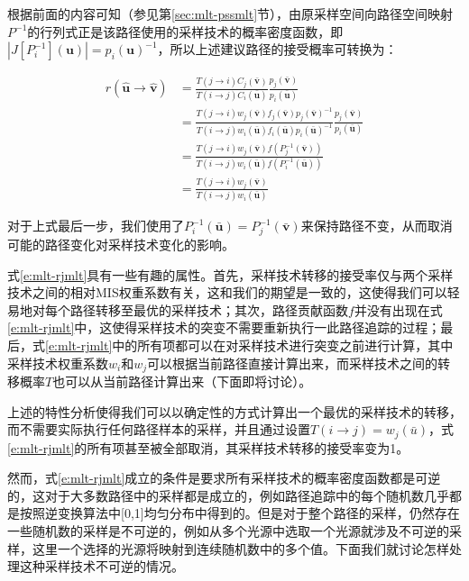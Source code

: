 根据前面的内容可知（参见第\ref{sec:mlt-pssmlt}节），由原采样空间向路径空间映射$P^{-1}$的行列式正是该路径使用的采样技术的概率密度函数，即$|J[P^{-1}_i](\mathbf{u})|=p_i(\mathbf{u})^{-1}$，所以上述建议路径的接受概率可转换为：

\begin{equation}\label{e:mlt-rjmlt}
\begin{aligned}
	r(\hat{\mathbf{u}}\to\hat{\mathbf{v}})&=\frac{T(j\to i)C_j(\bar{\mathbf{v}})}{T(i\to j)C_i(\bar{\mathbf{u}})}\frac{p_j(\bar{\mathbf{v}})}{p_i(\bar{\mathbf{u}})}\\
	&=\frac{T(j\to i)w_j(\bar{\mathbf{v}})f_j(\bar{\mathbf{v}})p_j(\bar{\mathbf{v}})^{-1}}{T(i\to j)w_i(\bar{\mathbf{u}})f_i(\bar{\mathbf{u}})p_i(\bar{\mathbf{u}})^{-1}}\frac{p_j(\bar{\mathbf{v}})}{p_i(\bar{\mathbf{u}})}\\
	&=\frac{T(j\to i)w_j(\bar{\mathbf{v}})f(P^{-1}_j(\bar{\mathbf{v}}))}{T(i\to j)w_i(\bar{\mathbf{u}})f(P^{-1}_i(\bar{\mathbf{u}}))}\\
	&=\frac{T(j\to i)w_j(\bar{\mathbf{v}})}{T(i\to j)w_i(\bar{\mathbf{u}})}
\end{aligned}
\end{equation}

\noindent 对于上式最后一步，我们使用了$P^{-1}_i(\bar{\mathbf{u}})=P^{-1}_j(\bar{\mathbf{v}})$来保持路径不变，从而取消可能的路径变化对采样技术变化的影响。

式\ref{e:mlt-rjmlt}具有一些有趣的属性。首先，采样技术转移的接受率仅与两个采样技术之间的相对MIS权重系数有关，这和我们的期望是一致的，这使得我们可以轻易地对每个路径转移至最优的采样技术；其次，路径贡献函数$f$并没有出现在式\ref{e:mlt-rjmlt}中，这使得采样技术的突变不需要重新执行一此路径追踪的过程；最后，式\ref{e:mlt-rjmlt}中的所有项都可以在对采样技术进行突变之前进行计算，其中采样技术权重系数$w_i$和$w_j$可以根据当前路径直接计算出来，而采样技术之间的转移概率$T$也可以从当前路径计算出来（下面即将讨论）。

上述的特性分析使得我们可以以确定性的方式计算出一个最优的采样技术的转移，而不需要实际执行任何路径样本的采样，并且通过设置$T(i\to j)=w_j(\bar{u})$，式\ref{e:mlt-rjmlt}的所有项甚至被全部取消，其采样技术转移的接受率变为1。

然而，式\ref{e:mlt-rjmlt}成立的条件是要求所有采样技术的概率密度函数都是可逆的，这对于大多数路径中的采样都是成立的，例如路径追踪中的每个随机数几乎都是按照逆变换算法中[0,1]均匀分布中得到的。但是对于整个路径的采样，仍然存在一些随机数的采样是不可逆的，例如从多个光源中选取一个光源就涉及不可逆的采样，这里一个选择的光源将映射到连续随机数中的多个值。下面我们就讨论怎样处理这种采样技术不可逆的情况。




